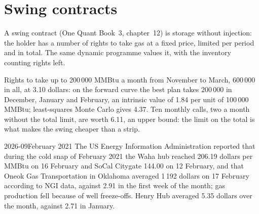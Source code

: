 \section{Swing contracts}

A swing contract (One Quant Book~3, chapter~12) is storage without injection: the holder
has a number of rights to take gas at a fixed price, limited per period and in total. The
same dynamic programme values it, with the inventory counting rights left.

\begin{example}\label{ex:rc:commodity-and-energy-derivatives:swing}
Rights to take up to 200\,000 MMBtu a month from November to March, 600\,000 in all, at
3.10 dollars: on the forward curve the best plan takes 200\,000 in December, January and
February, an intrinsic value of 1.84 per unit of 100\,000 MMBtu; least-squares Monte Carlo
gives 4.37. Ten monthly calls, two a month without the total limit, are worth 6.11, an
upper bound: the limit on the total is what makes the swing cheaper than a strip.
\end{example}

\begin{dated}{2026-09}{February 2021}\label{dat:rc:commodity-and-energy-derivatives:uri}
The US Energy Information Administration reported that during the cold snap of February
2021 the Waha hub reached 206.19 dollars per MMBtu on 16 February and SoCal Citygate 144.00
on 12 February, and that Oneok Gas Transportation in Oklahoma averaged 1\,192 dollars on
17 February according to NGI data, against 2.91 in the first week of the month; gas
production fell because of well freeze-offs. Henry Hub averaged 5.35 dollars over the month, against
2.71 in January.
\end{dated}

\begin{omfigure}

\label{fig:rc:commodity-and-energy-derivatives:hh}
\end{omfigure}

